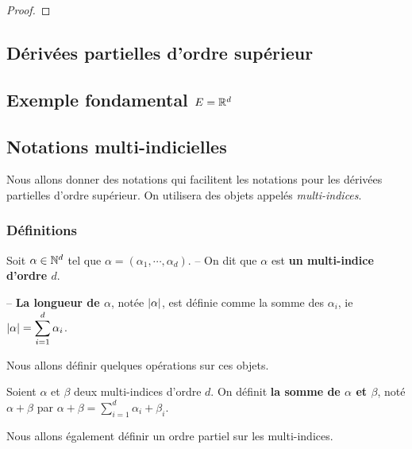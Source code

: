 \ifdefined\outputproof
\begin{proof}

\end{proof}
\fi

\subsection{Dérivées partielles d'ordre supérieur}


\subsection{Exemple fondamental $E = \mathbb{R}^{d}$}


\subsection{Notations multi-indicielles}

Nous allons donner des notations qui facilitent les notations pour les dérivées
partielles d'ordre supérieur. On utilisera des objets appelés
\textit{multi-indices}.

\subsubsection{Définitions}

\begin{definition} 
	Soit $\alpha \in \mathbb{N}^{d}$ tel que $\alpha = (\alpha_{1}, \cdots,
	\alpha_{d})$.
	-- On dit que $\alpha$ est \textbf{un multi-indice d'ordre $d$}.

	-- \textbf{La longueur de $\alpha$}, notée $|\alpha|$, est définie
	comme la somme des $\alpha_{i}$, ie $|\alpha| = \displaystyle
	\sum_{i = 1}^{d} \alpha_{i}$.
\end{definition}

Nous allons définir quelques opérations sur ces objets.

\begin{definition} 
	Soient $\alpha$ et $\beta$ deux multi-indices d'ordre $d$.
	On définit \textbf{la somme de $\alpha$ et $\beta$}, noté $\alpha + \beta$
	par $\alpha + \beta = \displaystyle \sum_{i = 1}^{d} \alpha_{i} +
	\beta_{i}$.
\end{definition}

Nous allons également définir un ordre partiel sur les multi-indices.

